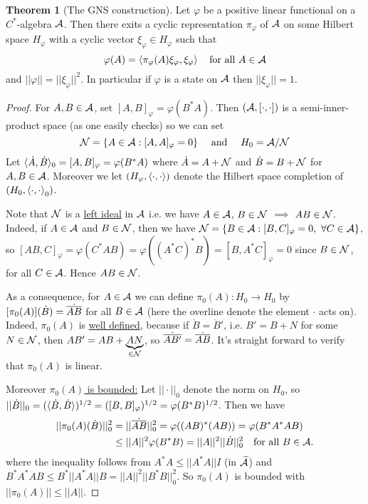 \documentclass[10pt,english,a4paper]{article}
\theoremstyle{definition}
\newtheorem*{theorem}{Theorem}
\def\tAs{\widetilde{\As}}
\def\dA{\dot{A}}
\def\dB{\dot{B}}
\def\dA{\dot{A}}
\def\dB{\dot{B}}
\def\vphi{\varphi}
\begin{document}
\begin{theorem}[The GNS construction]
    Let $\vphi$ be a positive linear functional on a $C^*$-algebra $\mathcal{A}$. Then 
there exits a cyclic representation $\pi_{\vphi}$ of $\mathcal{A}$ on some Hilbert space 
$H_{\vphi}$ with a cyclic vector $\xi_{\vphi} \in H_{\vphi}$ such that 
\[ \vphi(A) = \ind{\pi_{\vphi}(A)\xi_{\vphi},\xi_{\vphi}}\quad \text{for all }
A \in \As \]
and $||\vphi|| = ||\xi_{\vphi}||^2$. In particular if $\vphi$ is a state on $\mathcal{A}$
then $|| \xi_{\vphi} || = 1$.
\end{theorem}
\begin{proof}
    For $A,B \in \mathcal{A}$, set $[A,B]_{\vphi} = \vphi(B^*A)$. Then 
$(\mathcal{A},[\cdot,\cdot])$ is a semi-inner-product space (as one easily checks) 
so we can set 
\[ \Ns = \{ A \in \As : [A,A]_{\vphi} = 0 \} \quad \text{ and } \quad 
H_0 = \As /\Ns\]
Let $\indi{\dA,\dB}_0 = [A,B]_{\vphi} = \vphi(B^*A)$ where 
$\dA = A + \Ns$ and $\dB = B  + \Ns$ for $A,B \in \mathcal{A}$.
Moreover we let $(H_{\vphi}, \ind{\cdot,\cdot})$ denote the Hilbert space completion
of $(H_0, \left\langle \cdot,\cdot \right\rangle_0)$. 

Note that $\mathcal{N}$ is a \ul{left ideal} in $\mathcal{A}$
i.e. we have $A \in \mathcal{A}$, $B \in \mathcal{N}$ $\implies$ $AB \in \mathcal{N}$.
Indeed, if $A \in \mathcal{A}$ and $B \in \mathcal{N}$, then we have 
$\Ns = \{ B \in \As : [B,C]_{\vphi}= 0, ~\forall C \in \As\}$, so
$[AB,C]_{\vphi} = \vphi(C^*AB) = \vphi((A^*C)^*B) = [B,A^*C]_{\vphi} = 0$ since $B\in \mathcal{N}$, 
for all $C \in \mathcal{A}$. Hence $AB \in \mathcal{N}$.

As a consequence, for $A \in \mathcal{A}$ we can define $\pi_{0}(A)\colon H_0 \to H_0$
by $[\pi_0(A)](\dB) = \dot{\ol{AB}}$ for all $B \in \mathcal{A}$ (here the overline denote the 
element $\cdot$ acts on).
Indeed, $\pi_0(A)$ is \ul{well defined}, because 
if $\dB = \dB'$, i.e. $B' = B + N$ for some $N \in \mathcal{N}$, then
$AB' = AB + \underbrace{AN}_{\in \mathcal{N}}$, so $\dot{\overline{AB'}} = \dot{\overline{AB}}$.
It's straight forward to verify that $\pi_0(A)$ is linear.

Moreover \ul{$\pi_0(A)$ is bounded:}
Let $||\cdot||_0$ denote the norm on $H_0$, so 
$||\dB||_0 = (\indi{\dB, \dB})^{1/2} = ([B,B]_{\vphi})^{1/2} =
\vphi(B^*B)^{1/2}$. 
Then we have
\begin{align*}
    ||\pi_0(A)(\dB)||_{0}^{2} &= ||\dot{\ol{AB}}||_{0}^{2} = \vphi((AB)^*(AB)) 
   = \vphi(B^*A^*AB) \\
    &\leq ||A||^2\vphi(B^*B) = ||A||^2 ||\dot{B}||_{0}^{2} \quad \text{for all
    } B \in \As.
\end{align*}
where the inequality follows from $A^*A \leq ||A^*A|| I$ (in $\tAs$) and 
$B^*A^*AB \leq B^*||A^*A||B = ||A||^2 ||B^*B||_{0}^{2}$.
So $\pi_0(A)$ is bounded with $||\pi_0(A)|| \leq ||A||$. 


\end{proof}
\end{document}
